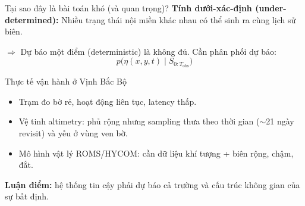 \documentclass[11pt,aspectratio=169]{beamer}
\begin{document}
\begin{frame}{Tại sao đây là bài toán khó (và quan trọng)?}
  \textbf{Tính dưới-xác-định (under-determined):}
  Nhiều trạng thái nội miền khác nhau có thể sinh ra cùng lịch sử biên.

  \vspace{6pt}
  $\Rightarrow$ Dự báo \alert{một điểm} (deterministic) là không đủ. Cần \alert{phân phối dự báo}:
  \[
  p\bigl(\eta(x,y,t) \mid S_{0:T_{\mathrm{obs}}}\bigr)
  \]

  \vspace{6pt}
  \begin{block}{Thực tế vận hành ở Vịnh Bắc Bộ}
    \begin{itemize}\itemsep2pt
      \item Trạm đo bờ rẻ, hoạt động liên tục, latency thấp.
      \item Vệ tinh altimetry: phủ rộng nhưng \alert{sampling thưa theo thời gian} ($\sim$21 ngày revisit) và yếu ở vùng ven bờ.
      \item Mô hình vật lý ROMS/HYCOM: cần dữ liệu khí tượng + biên rộng, chậm, đắt.
    \end{itemize}
  \end{block}

  \vspace{4pt}
  \textbf{Luận điểm:} hệ thống tin cậy phải dự báo cả \alert{trường} và \alert{cấu trúc không gian của sự bất định}.
\end{frame}
\end{document}
